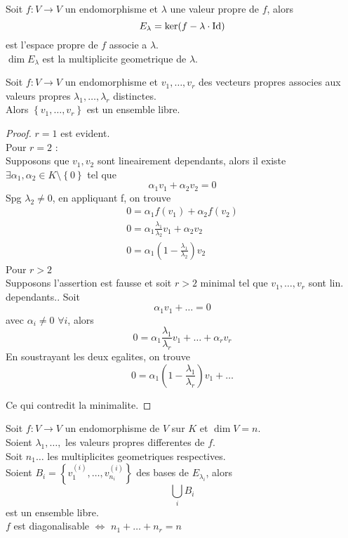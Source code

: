 \documentclass[../main.tex]{subfiles}
\begin{document}
\begin{defn}
	Soit $f:V \to V$ un endomorphisme et $\lambda$ une valeur propre de $f$, alors
	\[ 
		E_{\lambda} = \ker ( f- \lambda \cdot \operatorname*{Id}) 
	\]
	est l'espace propre de $f$ associe a $\lambda$.\\
	$\dim E_\lambda$ est la multiplicite geometrique de $\lambda$.
	
\end{defn}
\begin{lemma}
	Soit $f:V \to V$ un endomorphisme et $v_1, \ldots, v_r$ des vecteurs propres associes aux valeurs propres $\lambda_1, \ldots, \lambda_r$ distinctes.\\
	Alors $ \left\{ v_1, \ldots,v_r \right\} $ est un ensemble libre.
\end{lemma}
\begin{proof}
$r=1$ est evident.\\
Pour $r=2$ :\\
Supposons que $v_1,v_2$ sont lineairement dependants, alors il existe $\exists \alpha_1, \alpha_2 \in K\setminus \left\{ 0 \right\} $ tel que
\[ 
\alpha_1 v_1 + \alpha_2 v_2 = 0
\]
Spg $\lambda_2 \neq 0$, en appliquant f, on trouve
\begin{align*}
0 = \alpha_1 f( v_1) + \alpha_2 f( v_2) \\
0 = \alpha_1 \frac{\lambda_1}{\lambda_2}v_1 + \alpha_2 v_2\\
0 = \alpha_1 (  1- \frac{\lambda_1}{\lambda_2}) v_2
\end{align*}
Pour $r>2$ \\
Supposons l'assertion est fausse et soit $r>2$ minimal tel que $v_1, \ldots,v_r$ sont lin. dependants..
Soit
\[ 
\alpha_1 v_1 + \ldots = 0 
\]
avec $\alpha_i \neq 0$ $\forall i$, alors
\[ 
0 = \alpha_1 \frac{\lambda_1}{\lambda_r}v_1 + \ldots + \alpha_r v_r
\]
En soustrayant les deux egalites, on trouve
\[ 
	0 = \alpha_{1} ( 1-\frac{\lambda_1}{\lambda_r}) v_1 + \ldots 
\]

Ce qui contredit la minimalite.


\end{proof}
\begin{crly}
Soit $f:V \to V$ un endomorphisme de $V$ sur $K$ et $\dim V =n$.\\
Soient $\lambda_1, \ldots,$ les valeurs propres differentes de $f$.\\
Soit $n_1 \ldots$ les multiplicites geometriques respectives.\\
Soient $B_i = \left\{ v_1^{( i) }, \ldots, v_{n_i}^{( i ) } \right\} $ des bases de $E_{\lambda_i} $, alors
\[ 
	\bigcup_i B_i
\]
est un ensemble libre.\\
$f$ est diagonalisable $\iff$ $n_1 + \ldots + n_r=n$

\end{crly}
\end{document}
